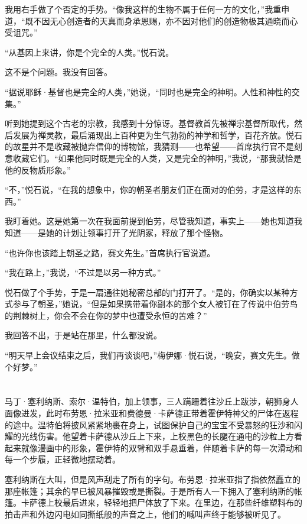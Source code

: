 \documentclass[AutoFakeBold=true]{book}
\begin{document}
我用右手做了个否定的手势。``像我这样的生物不属于任何一方的文化，''我重申道，``既不因无心创造者的天真而身承恩赐，亦不因对他们的创造物极其通晓而心受诅咒。''

``从基因上来讲，你是个完全的人类。''悦石说。

这不是个问题。我没有回答。

``据说耶稣·基督也是完全的人类，''她说，``同时也是完全的神明。人性和神性的交集。''

听到她提到这个古老的宗教，我感到十分惊讶。基督教首先被禅宗基督所取代，然后发展为禅灵教，最后涌现出上百种更为生气勃勃的神学和哲学，百花齐放。悦石的故星并不是收藏被抛弃信仰的博物馆，我猜测——也希望——首席执行官不是刻意收藏它们。``如果他同时既是完全的人类，又是完全的神明，''我说，``那我就恰是他的反物质形象。''

``不，''悦石说，``在我的想象中，你的朝圣者朋友们正在面对的伯劳，才是这样的东西。''

我盯着她。这是她第一次在我面前提到伯劳，尽管我知道，事实上——她也知道我知道——是她的计划让领事打开了光阴冢，释放了那个怪物。

``也许你也该踏上朝圣之路，赛文先生。''首席执行官说道。

``我在路上，''我说，``不过是以另一种方式。''

悦石做了个手势，于是一扇通往她秘密总部的门打开了。``是的，你确实以某种方式参与了朝圣，''她说，``但是如果携带着你副本的那个女人被钉在了传说中伯劳鸟的荆棘树上，你会不会在你的梦中也遭受永恒的苦难？''

我回答不出，于是站在那里，什么都没说。

``明天早上会议结束之后，我们再谈谈吧，''梅伊娜·悦石说，``晚安，赛文先生。做个好梦。''

\chapter{}

马丁·塞利纳斯、索尔·温特伯，加上领事，三人蹒跚着往沙丘上跋涉，朝狮身人面像进发，此时布劳恩·拉米亚和费德曼·卡萨德正带着霍伊特神父的尸体在返程的途中。温特伯将披风紧紧地裹在身上，试图保护自己的宝宝不受暴怒的狂沙和闪耀的光线伤害。他望着卡萨德从沙丘上下来，上校黑色的长腿在通电的沙粒上方看起来就像漫画中的形象，霍伊特的双臂和双手悬垂着，伴随着卡萨的每一次滑动和每一个步履，正轻微地摆动着。

塞利纳斯在大叫，但是风声刮走了所有的字句。布劳恩·拉米亚指了指依然矗立的那座帐篷；其余的早已被风暴摧毁或是撕裂。于是所有人一下拥入了塞利纳斯的帐篷。卡萨德上校最后进来，轻轻地把尸体放了下来。在里边，在那些纤维塑料布的拍击声和外边闪电如同撕纸般的声音之上，他们的喊叫声终于能够被听见了。
\end{document}
